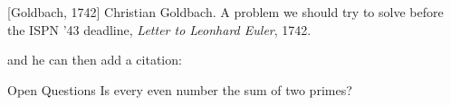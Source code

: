 \documentclass[t,aspectratio=54]{beamer}
\begin{document}
  \begin{thebibliography}{10}
    [Goldbach, 1742]
      Christian Goldbach.
      \newblock A problem we should try to solve before the ISPN ’43 deadline,
      \newblock \emph{Letter to Leonhard Euler}, 1742.
    \end{thebibliography}
  and he can then add a citation:
  \begin{block}{Open Questions}
    Is every even number the sum of two primes?
    \cite{Goldbach1742}
  \end{block}
\end{document}
